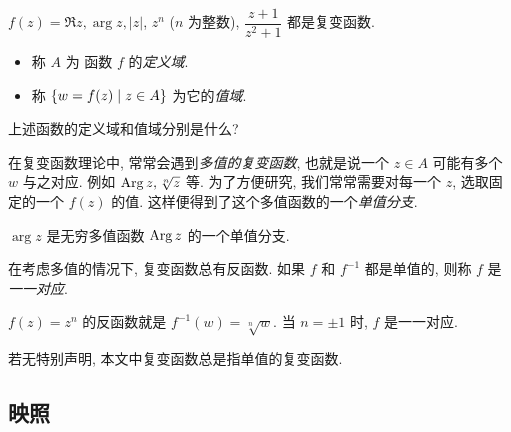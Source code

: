 \begin{example}
  $f(z)=\Re z,\arg z,|z|$, $z^n$ ($n$ 为整数), $\dfrac{z+1}{z^2+1}$ 都是复变函数.
\end{example}

\begin{definition}[复变函数的定义域和值域]
  \begin{itemize}
    \item 称 $A$ 为 函数 $f$ 的\emph{定义域}.
    \item 称 ${\left\{w=f(z)\mid z\in A\right\}}$ 为它的\emph{值域}.
  \end{itemize} 
\end{definition}
\begin{exercise}
  上述函数的定义域和值域分别是什么?
\end{exercise}

在复变函数理论中, 常常会遇到\emph{多值的复变函数}, 也就是说一个 $z\in A$ 可能有多个 $w$ 与之对应.
例如 $\operatorname{Arg} z,\sqrt[n]z$ 等.
为了方便研究, 我们常常需要对每一个 $z$, 选取固定的一个 $f(z)$ 的值.
这样便得到了这个多值函数的一个\emph{单值分支}.
\begin{example}
  $\arg z$ 是无穷多值函数 $\operatorname{Arg} z$ 的一个单值分支.
\end{example}

在考虑多值的情况下, 复变函数总有反函数.
如果 $f$ 和 $f^{-1}$ 都是单值的, 则称 $f$ 是\emph{一一对应}.
\begin{example}
  $f(z)=z^n$ 的反函数就是 $f^{-1}(w)=\sqrt[n]{w}$.
  {当 $n=\pm1$ 时, $f$ 是一一对应.}
\end{example}
若无特别声明, 本文中\alert{复变函数总是指单值的复变函数}.


\subsection{映照}

